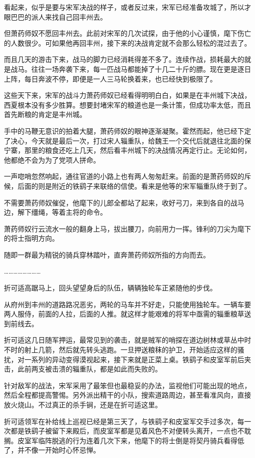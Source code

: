 看起来，似乎是要与宋军决战的样子，或者反过来，宋军已经准备攻城了，所以才眼巴巴的派人来找自己回丰州去。

但萧药师奴不愿回丰州去。此前对宋军的几次试探，由于他的小心谨慎，麾下伤亡的人数很少。可如果他再回丰州，接下来的决战肯定就不会那么轻松的混过去了。

而且几天的游击下来，战马的脚力已经消耗得差不多了。连续作战，损耗最大的就是战马。往往一场奔袭下来，每一匹战马都能掉了十几二十斤的膘。现在更是逐日上阵，每日奔波不停，即便是一人三马轮换着来，也已经快到极限了。

这些天下来，宋军的战斗力萧药师奴已经看得明明白白，如果是在丰州城下决战，西夏根本没有多少胜算。想要封堵宋军的粮道也是一条计策，但成功率太低，而且首先断粮的肯定是丰州城。

手中的马鞭无意识的拍着大腿，萧药师奴的眼神逐渐凝聚。霍然而起，他已经下定了决心，今天就是最后一次，打过宋人辎重队，给魏王一个交代后就退往北面的保宁寨，那里的粮食还吃上几天，然后看丰州城下的决战情况再定行止。无论如何，他都绝不会为为了党项人拼命。

一声唿哨忽然响起，通往官道的小路上也有两人匆匆赶来。前面的是萧药师奴的斥候，后面的则是附近的铁鹞子来联络的信使。看来是他等的宋军辎重队终于到了。

不需要萧药师奴催促，他麾下的儿郎全都站了起来，收好弓刀，来到各自的战马边，解下缰绳，等着主将的命令。

萧药师奴行云流水一般的翻身上马，拔出腰刀，向前用力一挥。锋利的刀尖为麾下的将士指明方向。

随即一群最为精锐的骑兵穿林踏叶，直奔萧药师奴所指的方向而去。

……………………

折可适高踞马上，回头望望身后的队伍，辆辆独轮车正紧随他的步伐。

从府州到丰州的道路路况恶劣，两轮的马车并不好走，只能使用独轮车。一辆车要两人服侍，前面的人拉，后面的人推。就这样才能艰难的将军中亟需的辎重粮草送到前线去。

折可适这几日随军押运，最常见到的袭击，就是贼军的哨探在道边树林或草丛中时不时的射上几箭，然后就先转头逃跑。一旦押送粮秣的护卫，开始适应这样的骚扰，对一系列的异动变得漠视起来，接下来就是正菜上桌。铁鹞子和皮室军前后夹击，此前两支被击溃的辎重队，都是如此而失败的。

针对敌军的战法，宋军采用了最笨但也最稳妥的办法，监视他们可能出现的地点，然后全程都提高警惕。另外派出精干的小队，搜索道路周边，甚至看准风向，直接放火烧山。不过真正的杀手锏，还是在折可适这里。

折可适领军在补给线上巡视已经是第三天了，与铁鹞子和皮室军交手过多次，每一次都是铁鹞子被留下来殿后，而皮室军都是见着风色不对便转头离开，一点也不耽搁。皮室军临阵脱逃的行为连着几次下来，他麾下的将士倒是将契丹骑兵看得低了，并不像一开始时心怀忌惮。

